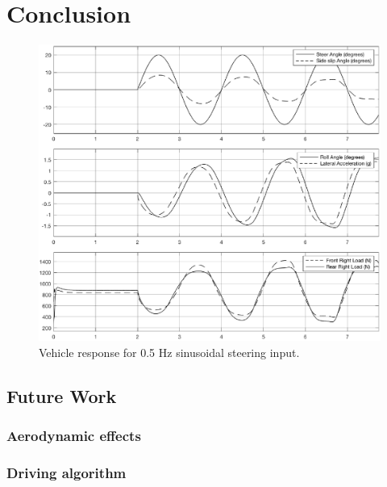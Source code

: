 \chapter{Conclusion}
\label{chap:conclusion}

\begin{figure}[ht]
  \centering
  \includegraphics[scale=0.8]{figures/sine}
  \caption{Vehicle response for 0.5 Hz sinusoidal steering input.}
  \label{regression}
\end{figure}
\section{Future Work}
\label{sec:future}
\subsection{Aerodynamic effects}
\subsection{Driving algorithm}
